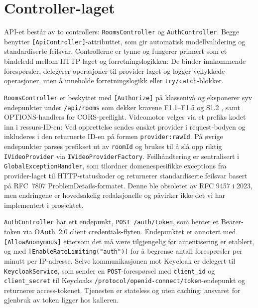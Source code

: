 \section{Controller-laget}
\label{sec:controllers}

API-et består av to controllers: \texttt{RoomsController} og \texttt{AuthController}. Begge benytter \texttt{[ApiController]}-attributtet, som gir automatisk modellvalidering og standardiserte feilsvar. Controllerne er tynne og fungerer primært som et bindeledd mellom HTTP-laget og forretningslogikken: De binder innkommende forespørsler, delegerer operasjoner til provider-laget og logger vellykkede operasjoner, uten å inneholde forretningslogikk eller \texttt{try/catch}-blokker.

\texttt{RoomsController} er beskyttet med \texttt{[Authorize]} på
klassenivå og eksponerer syv endepunkter under \texttt{/api/rooms} som dekker kravene F1.1--F1.5 og S1.2 \cite{hdo_kravspec}, samt OPTIONS-handlers for CORS-preflight. Videomotor velges via et prefiks kodet inn i ressurs-ID-en: Ved opprettelse sendes ønsket provider i request-bodyen og inkluderes i den returnerte ID-en på formen \texttt{provider:rawId}. På øvrige endepunkter parses
prefikset ut av \texttt{roomId} og brukes til å slå opp riktig
\texttt{IVideoProvider} via \texttt{IVideoProviderFactory}.
Feilhåndtering er sentralisert i \texttt{GlobalExceptionHandler}, som tilordner domenespesifikke exceptions fra provider-laget til HTTP-statuskoder og returnerer standardiserte feilsvar basert på RFC~7807 ProblemDetails-formatet. Denne ble obsoletet av RFC 9457 i 2023, men endringene er hovedsakelig redaksjonelle og påvirker ikke det vi har implementert i prosjektet.

\texttt{AuthController} har ett endepunkt, \texttt{POST /auth/token},
som henter et Bearer-token via OAuth~2.0 client credentials-flyten.
Endepunktet er annotert med \texttt{[AllowAnonymous]} ettersom det må være tilgjengelig før autentisering er etablert, og med \texttt{[EnableRateLimiting("auth")]} for å begrense antall forespørsler per minutt per IP-adresse. Selve kommunikasjonen mot Keycloak er delegert til \texttt{KeycloakService}, som sender en \texttt{POST}-forespørsel med \texttt{client\_id} og \texttt{client\_secret} til Keycloaks \texttt{/protocol/openid-connect/token}-endepunkt og returnerer access-tokenet. Tjenesten er stateless og uten caching; ansvaret for gjenbruk av token ligger hos kalleren.